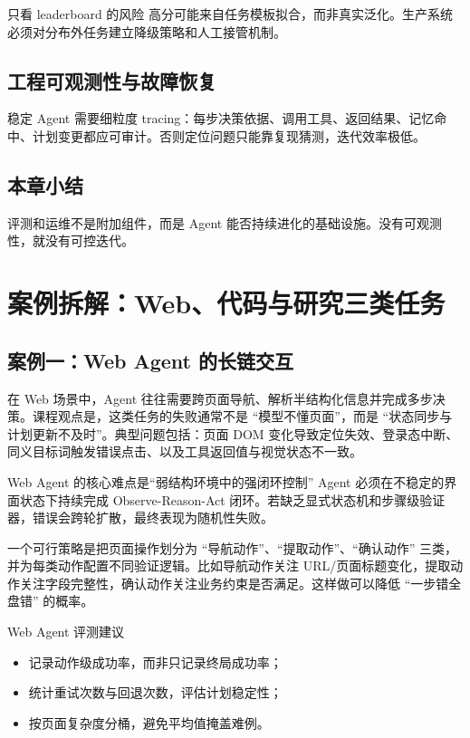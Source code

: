 \documentclass[a4paper]{article}
\begin{document}
\begin{warningbox}{只看 leaderboard 的风险}
高分可能来自任务模板拟合，而非真实泛化。生产系统必须对分布外任务建立降级策略和人工接管机制。
\end{warningbox}

\subsection{工程可观测性与故障恢复}
稳定 Agent 需要细粒度 tracing：每步决策依据、调用工具、返回结果、记忆命中、计划变更都应可审计。否则定位问题只能靠复现猜测，迭代效率极低。

\subsection{本章小结}
评测和运维不是附加组件，而是 Agent 能否持续进化的基础设施。没有可观测性，就没有可控迭代。

\section{案例拆解：Web、代码与研究三类任务}

\subsection{案例一：Web Agent 的长链交互}
在 Web 场景中，Agent 往往需要跨页面导航、解析半结构化信息并完成多步决策。课程观点是，这类任务的失败通常不是 ``模型不懂页面''，而是 ``状态同步与计划更新不及时''。典型问题包括：页面 DOM 变化导致定位失效、登录态中断、同义目标词触发错误点击、以及工具返回值与视觉状态不一致。

\begin{importantbox}{Web Agent 的核心难点是“弱结构环境中的强闭环控制”}
Agent 必须在不稳定的界面状态下持续完成 Observe-Reason-Act 闭环。若缺乏显式状态机和步骤级验证器，错误会跨轮扩散，最终表现为随机性失败。
\end{importantbox}

一个可行策略是把页面操作划分为 ``导航动作''、``提取动作''、``确认动作'' 三类，并为每类动作配置不同验证逻辑。比如导航动作关注 URL/页面标题变化，提取动作关注字段完整性，确认动作关注业务约束是否满足。这样做可以降低 ``一步错全盘错'' 的概率。

\begin{knowledgebox}{Web Agent 评测建议}
\begin{itemize}
    \item 记录动作级成功率，而非只记录终局成功率；
    \item 统计重试次数与回退次数，评估计划稳定性；
    \item 按页面复杂度分桶，避免平均值掩盖难例。
\end{itemize}
\end{knowledgebox}
\end{document}
